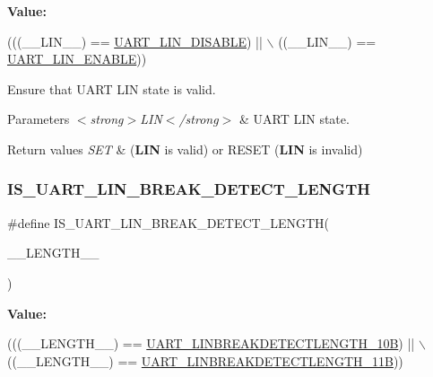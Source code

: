 {\bfseries Value\+:}
\begin{DoxyCode}
(((\_\_LIN\_\_) == \hyperlink{group___u_a_r_t_ex___l_i_n_ga7bc4a2de3d6b29235188020628c4b30c}{UART\_LIN\_DISABLE}) || \(\backslash\)
                                     ((\_\_LIN\_\_) == \hyperlink{group___u_a_r_t_ex___l_i_n_gaf3f2741d3af2737c51c3040e79fdc664}{UART\_LIN\_ENABLE}))
\end{DoxyCode}


Ensure that U\+A\+RT L\+IN state is valid. 


\begin{DoxyParams}{Parameters}
{\em $<$strong$>$\+L\+I\+N$<$/strong$>$} & U\+A\+RT L\+IN state. \\
\hline
\end{DoxyParams}

\begin{DoxyRetVals}{Return values}
{\em S\+ET} & ({\bfseries L\+IN} is valid) or R\+E\+S\+ET ({\bfseries L\+IN} is invalid) \\
\hline
\end{DoxyRetVals}
\mbox{\label{group___u_a_r_t_ex___private___macros_gac8ac0d0dc7fad5edf53150ce05d902ee}} 
\subsubsection{\texorpdfstring{I\+S\+\_\+\+U\+A\+R\+T\+\_\+\+L\+I\+N\+\_\+\+B\+R\+E\+A\+K\+\_\+\+D\+E\+T\+E\+C\+T\+\_\+\+L\+E\+N\+G\+TH}{IS\_UART\_LIN\_BREAK\_DETECT\_LENGTH}}
{\footnotesize\ttfamily \#define I\+S\+\_\+\+U\+A\+R\+T\+\_\+\+L\+I\+N\+\_\+\+B\+R\+E\+A\+K\+\_\+\+D\+E\+T\+E\+C\+T\+\_\+\+L\+E\+N\+G\+TH(\begin{DoxyParamCaption}\item[{}]{\+\_\+\+\_\+\+L\+E\+N\+G\+T\+H\+\_\+\+\_\+ }\end{DoxyParamCaption})}

{\bfseries Value\+:}
\begin{DoxyCode}
(((\_\_LENGTH\_\_) == \hyperlink{group___u_a_r_t_ex___l_i_n___break___detection_ga027616b7a36b36e0e51ffee947533624}{UART\_LINBREAKDETECTLENGTH\_10B}) || \(\backslash\)
                                                     ((\_\_LENGTH\_\_) == 
      \hyperlink{group___u_a_r_t_ex___l_i_n___break___detection_ga2f66fcd37de7a3ca9e1101305f2e23e6}{UART\_LINBREAKDETECTLENGTH\_11B}))
\end{DoxyCode}


